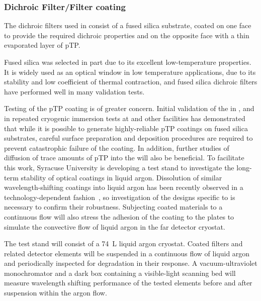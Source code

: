 \subsubsection{Dichroic Filter/Filter coating}

The dichroic filters used in  consist of a fused silica substrate, coated on one face to provide the required dichroic properties and on the opposite face with a thin evaporated layer of pTP.

Fused silica was selected in part due to its excellent low-temperature properties.  It is widely used as an optical window in low temperature applications, due to its stability and low coefficient of thermal contraction, and fused silica dichroic filters have performed well in many  validation tests.

Testing of the pTP coating is of greater concern.  Initial validation of the  in ,  and in repeated cryogenic immersion tests at  and other facilities has demonstrated that while it is possible to generate highly-reliable pTP coatings on fused silica substrates, careful surface preparation and deposition procedures are required to prevent catastrophic failure of the coating.  In addition, further studies of diffusion of trace amounts of pTP into the  will also be beneficial.  To facilitate this work,  
Syracuse University is 
 developing a test stand to investigate the long-term stability of  optical coatings in liquid argon. Dissolution of similar wavelength-shifting coatings into liquid argon has been recently observed in a technology-dependent fashion~\cite{Asaadi:2018ixs}, so investigation of the designs specific to  is necessary to confirm their robustness. Subjecting coated materials to a continuous flow will also stress the adhesion of the coating to the plates to simulate the convective flow of liquid argon in the far detector cryostat.

The test stand will consist of a \SI{74}{L} liquid argon cryostat. Coated filters and related detector elements will be suspended in a continuous flow of liquid argon and periodically inspected for degradation in their response. A vacuum-ultraviolet monochromator and a dark box containing a visible-light scanning bed will measure wavelength shifting performance of the tested elements before and after suspension within the argon flow.


